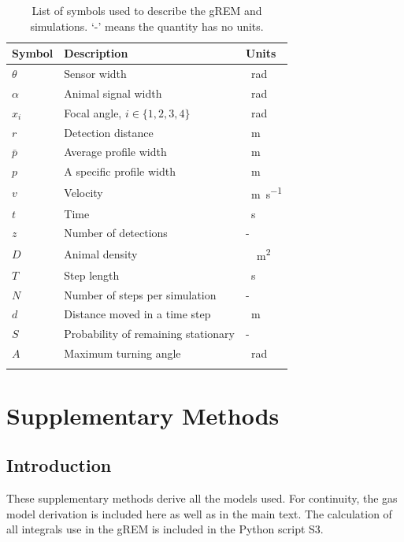 \documentclass[a4paper,10pt,reqno,oneside]{amsart}
\begin{document}
\begin{table}[h!]
\centering
\begin{tabular}{lll}
Symbol 	& Description & Units\\\hline
$\theta$	& Sensor width & \SI{}{\radian} \\
$\alpha$	& Animal signal width & \SI{}{\radian} \\
$x_i$	        & Focal angle, $i \in \{1,2,3,4\} $ 	& \SI{}{\radian}\\
$r$ 		& Detection distance & \SI{}{\meter}\\
$\bar{p}$ 		& Average profile width & \SI{}{\meter}\\
$p$ 		& A specific profile width & \SI{}{\meter}\\
$v$		& Velocity & \SI{}{\meter\per\second}\\
$t$		& Time & \SI{}{\second}\\
$z$		& Number of detections & -\\
$D$		& Animal density & \SI{}{\per\meter\squared} \\
$T$ 		& Step length & \SI{}{\second}\\
$N$ 		& Number of steps per simulation & -\\
$d$ 		& Distance moved in a time step & \SI{}{\meter}\\
$S$ 		& Probability of remaining stationary & -\\
$A$ 		& Maximum turning angle & \SI{}{\radian}\\
\\
\end{tabular}
\caption{List of symbols used to describe the gREM and simulations. `-' means the quantity has no units.}
\label{t:paras}
\end{table}

\clearpage

\section{Supplementary Methods}
\subsection{Introduction}
These supplementary methods derive all the models used. For continuity, the gas model derivation is included here as well as in the main text. The calculation of all integrals use in the gREM is included in the Python script S3. 





\end{document}
